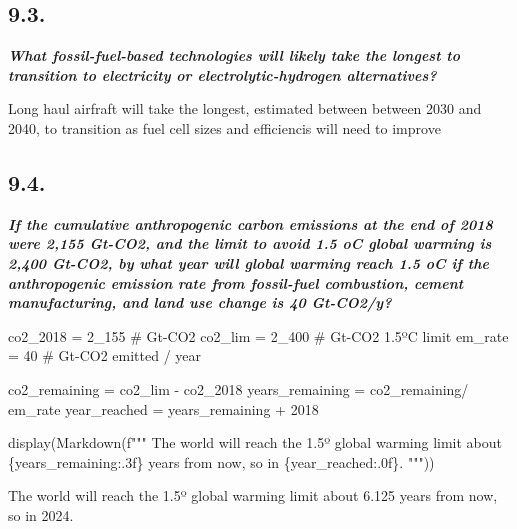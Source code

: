 \documentclass[
  letterpaper,
  DIV=11,
  numbers=noendperiod]{scrartcl}
\newenvironment{Shaded}{\begin{snugshade}}{\end{snugshade}}
\newcommand{\CommentTok}[1]{\textcolor[rgb]{0.37,0.37,0.37}{#1}}
\newcommand{\DecValTok}[1]{\textcolor[rgb]{0.68,0.00,0.00}{#1}}
\newcommand{\NormalTok}[1]{\textcolor[rgb]{0.00,0.23,0.31}{#1}}
\newcommand{\OperatorTok}[1]{\textcolor[rgb]{0.37,0.37,0.37}{#1}}
\newcommand{\SpecialCharTok}[1]{\textcolor[rgb]{0.37,0.37,0.37}{#1}}
\newcommand{\SpecialStringTok}[1]{\textcolor[rgb]{0.13,0.47,0.30}{#1}}
\begin{document}
\hypertarget{section-17}{%
\subsection{9.3.}\label{section-17}}

\textbf{\emph{What fossil-fuel-based technologies will likely take the
longest to transition to electricity or electrolytic-hydrogen
alternatives?}}

Long haul airfraft will take the longest, estimated between between 2030
and 2040, to transition as fuel cell sizes and efficiencis will need to
improve

\hypertarget{section-18}{%
\subsection{9.4.}\label{section-18}}

\textbf{\emph{If the cumulative anthropogenic carbon emissions at the
end of 2018 were 2,155 Gt-CO2, and the limit to avoid 1.5 oC global
warming is 2,400 Gt-CO2, by what year will global warming reach 1.5 oC
if the anthropogenic emission rate from fossil-fuel combustion, cement
manufacturing, and land use change is 40 Gt-CO2/y?}}

\begin{Shaded}
\begin{Highlighting}[]
\NormalTok{co2\_2018 }\OperatorTok{=} \DecValTok{2\_155} \CommentTok{\# Gt{-}CO2}
\NormalTok{co2\_lim }\OperatorTok{=} \DecValTok{2\_400} \CommentTok{\# Gt{-}CO2 1.5ºC limit }
\NormalTok{em\_rate }\OperatorTok{=} \DecValTok{40} \CommentTok{\# Gt{-}CO2 emitted / year }

\NormalTok{co2\_remaining }\OperatorTok{=}\NormalTok{ co2\_lim }\OperatorTok{{-}}\NormalTok{ co2\_2018 }
\NormalTok{years\_remaining }\OperatorTok{=}\NormalTok{ co2\_remaining}\OperatorTok{/}\NormalTok{ em\_rate }
\NormalTok{year\_reached }\OperatorTok{=}\NormalTok{ years\_remaining }\OperatorTok{+} \DecValTok{2018}

\NormalTok{display(Markdown(}\SpecialStringTok{f"""}
\SpecialStringTok{The world will reach the 1.5º global warming limit about }\SpecialCharTok{\{}\NormalTok{years\_remaining}\SpecialCharTok{:.3f\}}\SpecialStringTok{ years from now, so in }\SpecialCharTok{\{}\NormalTok{year\_reached}\SpecialCharTok{:.0f\}}\SpecialStringTok{.}
\SpecialStringTok{"""}\NormalTok{))}
\end{Highlighting}
\end{Shaded}

The world will reach the 1.5º global warming limit about 6.125 years
from now, so in 2024.
\end{document}
